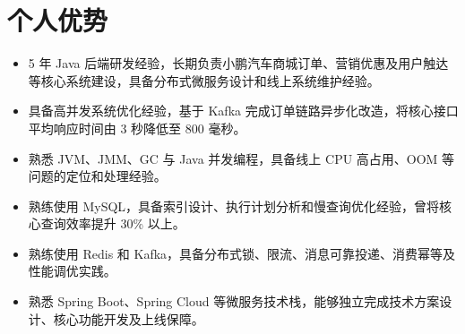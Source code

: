 \section{个人优势}
\begin{itemize}
  \item 5 年 Java 后端研发经验，长期负责小鹏汽车商城订单、营销优惠及用户触达等核心系统建设，具备分布式微服务设计和线上系统维护经验。
  \item 具备高并发系统优化经验，基于 Kafka 完成订单链路异步化改造，将核心接口平均响应时间由 3 秒降低至 800 毫秒。
  \item 熟悉 JVM、JMM、GC 与 Java 并发编程，具备线上 CPU 高占用、OOM 等问题的定位和处理经验。
  \item 熟练使用 MySQL，具备索引设计、执行计划分析和慢查询优化经验，曾将核心查询效率提升 30\% 以上。
  \item 熟练使用 Redis 和 Kafka，具备分布式锁、限流、消息可靠投递、消费幂等及性能调优实践。
  \item 熟悉 Spring Boot、Spring Cloud 等微服务技术栈，能够独立完成技术方案设计、核心功能开发及上线保障。
\end{itemize}
